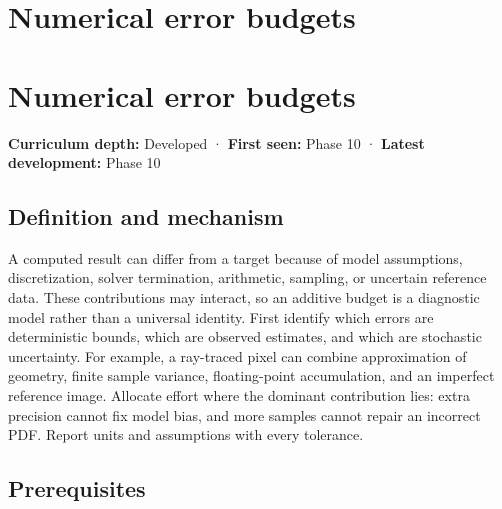 \hypertarget{appendix-31b8c295e05f}{}
\section*{Numerical error budgets}
\section{Numerical error budgets}\label{appendix-31b8c295e05f-numerical-error-budgets}

\textbf{Curriculum depth:} Developed · \textbf{First seen:} Phase 10 · \textbf{Latest development:} Phase 10

\subsection{Definition and mechanism}\label{appendix-31b8c295e05f-definition-and-mechanism}

A computed result can differ from a target because of model assumptions, discretization, solver termination, arithmetic, sampling, or uncertain reference data. These contributions may interact, so an additive budget is a diagnostic model rather than a universal identity. First identify which errors are deterministic bounds, which are observed estimates, and which are stochastic uncertainty. For example, a ray-traced pixel can combine approximation of geometry, finite sample variance, floating-point accumulation, and an imperfect reference image. Allocate effort where the dominant contribution lies: extra precision cannot fix model bias, and more samples cannot repair an incorrect PDF. Report units and assumptions with every tolerance.

\subsection{Prerequisites}\label{appendix-31b8c295e05f-prerequisites}

